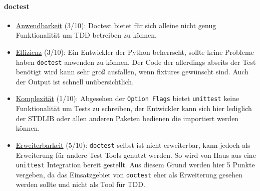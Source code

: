 \paragraph{doctest}\label{zusammenfassung:unit:doctest}\mbox{}
\newline
\begin{itemize}
    \item \underline{Anwendbarkeit} (3/10):\newline
    Doctest bietet für sich alleine nicht genug Funktionalität um TDD betreiben
    zu können.
    
    \item \underline{Effizienz} (3/10):\newline
    Ein Entwickler der Python beherrscht, sollte keine Probleme haben
    \lstinline{doctest} anwenden zu können. Der Code der allerdings abseits
    der Test benötigt wird kann sehr groß ausfallen, wenn \Glspl{fixture}
    gewünscht sind. Auch der Output ist schnell unübersichtlich.
    
    \item \underline{Komplexität} (1/10):\newline
    Abgesehen der \lstinline{Option Flags} bietet \lstinline{unittest} keine
    Funktionalität um Tests zu schreiben, der Entwickler kann sich hier
    lediglich der STDLIB oder allen anderen Paketen bedienen die importiert
    werden können.
    
    \item \underline{Erweiterbarkeit} (5/10):\newline
    \lstinline{doctest} selbst ist nicht erweiterbar, kann jedoch als
    Erweiterung für andere Test Tools genutzt werden. So wird von Haus aus
    eine \lstinline{unittest} Integration bereit gestellt. Aus diesem Grund
    werden hier 5 Punkte vergeben, da das Einsatzgebiet von \lstinline{doctest}
    eher als Erweiterung gesehen werden sollte und nicht als Tool für TDD.
\end{itemize}

